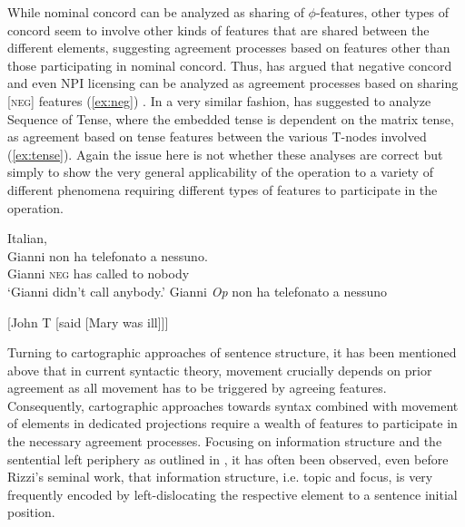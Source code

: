 \documentclass[output=paper
,modfonts
,nonflat]{langsci/langscibook}
\begin{document}
\begin{exe}
	\ex \label{ex:binding}
	\begin{xlist}
	\end{xlist}
	\ex
	\begin{xlist}
		 \label{ex:raising}
		 \label{ex:control}
	\end{xlist}
\end{exe}
While nominal concord can be analyzed as sharing of $ \phi $-fea\-tures, other types of concord seem to involve other kinds of features that are shared between the different elements, suggesting agreement processes based on features other than those participating in nominal concord. Thus, \citet{zeijlstra2004} has argued that negative concord and even NPI licensing can be analyzed as agreement processes based on sharing [\textsc{neg}] features (\ref{ex:neg}) \citep{haegemanzanuttini1991}. In a very similar fashion, \citet{Zeijlstra2012} has suggested to analyze Sequence of Tense, where the embedded tense is dependent on the matrix tense, as agreement based on tense features between the various T-nodes involved (\ref{ex:tense}).
Again the issue here is not whether these analyses are correct but simply to show the very general applicability of the operation {\agr} to a variety of different phenomena requiring different types of features to participate in the operation.

\begin{exe}
	\ex \label{ex:neg}
	\begin{xlist}
		\ex	 Italian, \citep{zeijlstra2004}\\
		\gll Gianni non ha telefonato a nessuno.\\
		Gianni \textsc{neg} has called to nobody\\
		\glt `Gianni didn’t call anybody.'
		\ex Gianni \textit{Op} non ha telefonato a  nessuno\sub{[\textsc{neg}]}
	\end{xlist}
\end{exe}

\begin{exe}
	\ex \label{ex:tense} {[}John T  [said [Mary was ill]]] \hfill \citep{Zeijlstra2012}
\end{exe}
Turning to cartographic approaches of sentence structure, it has been mentioned above that in current syntactic theory, movement crucially depends on prior agreement as all movement has to be triggered by agreeing features. Consequently, cartographic approaches towards syntax combined with movement of elements in dedicated projections require a wealth of features to participate in the necessary agreement processes. Focusing on information structure and the sentential left periphery as outlined in \citet{Rizzi1997}, it has often been observed, even before Rizzi's seminal work, that information structure, i.e. topic and focus, is very frequently encoded by left-dislocating the respective element to a sentence initial position.
\end{document}
